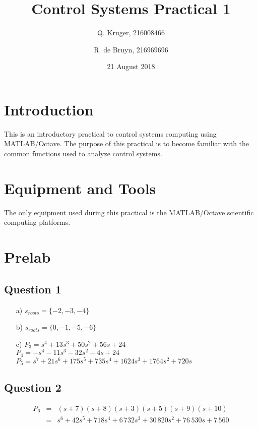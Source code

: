 \documentclass[12pt, a4paper]{article}
\title{Control Systems Practical 1}
\date{21 August 2018}
\author{Q. Kruger, 216008466 \and R. de Bruyn, 216969696}
\begin{document}
	\maketitle
	\newpage
	\tableofcontents
	\newpage
	
	\section{Introduction} %
	\label{sec:introduction}
		This is an introductory practical to control systems computing using MATLAB/Octave. The purpose of this practical is to become familiar with the common functions used to analyze control systems.

	\section{Equipment and Tools} %
	\label{sec:equipment_and_tools}
		The only equipment used during this practical is the MATLAB/Octave scientific computing platforms.

	\section{Prelab} %
	\label{sec:prelab}
		\subsection*{Question 1} %
		\label{sub:question_1}
			\begin{itemize}
				\item[a)] $s_{roots} = \{-2,-3,-4\}$
				\item[b)] $s_{roots} = \{0,-1,-5,-6\}$
				\item[c)] $P_3 = s^4 + 13s^3 + 50s^2 + 56s + 24$\\
						  $P_4 = -s^4 -11s^3 -32s^2 -4s + 24$ \\
						  $P_5 = s^7 + 21s^6 + 175s^5 +735s^4 + 1624s^3 + 1764s^2 + 720s$
			\end{itemize}

		\subsection*{Question 2} %
		\label{sub:question_2}
			\begin{equation*}
				\begin{array}{rcl}
					P_6 & = & (s+7)(s+8)(s+3)(s+5)(s+9)(s+10) \\
					& = & s^6 + 42s^5 +718s^4 + 6\,732s^3 + 30\,820s^2 + 76\,530s + 7\,560
				\end{array}
			\end{equation*}
\end{document}
